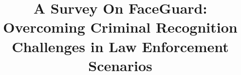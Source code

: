 \documentclass[conference]{IEEEtran}
\begin{document}

	\title{A Survey On FaceGuard: Overcoming Criminal Recognition Challenges in Law Enforcement Scenarios}

	

	\maketitle

	
	
	
	
	

	
\end{document}
